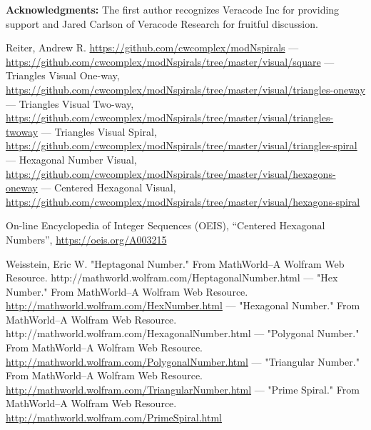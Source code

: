 \documentclass[11pt,reqno]{amsart}
\theoremstyle{mydef}
\begin{document}
\vspace{12pt}\noindent\textbf{Acknowledgments:}\quad
The first author recognizes Veracode Inc for providing support and Jared Carlson of Veracode Research for 
fruitful discussion.

\begin{thebibliography}{1}
 Reiter, Andrew R. \url{https://github.com/cwcomplex/modNspirals}
 ---  \url{https://github.com/cwcomplex/modNspirals/tree/master/visual/square}
 --- Triangles Visual One-way, \url{https://github.com/cwcomplex/modNspirals/tree/master/visual/triangles-oneway}
 --- Triangles Visual Two-way, \url{https://github.com/cwcomplex/modNspirals/tree/master/visual/triangles-twoway}
 --- Triangles Visual Spiral, \url{https://github.com/cwcomplex/modNspirals/tree/master/visual/triangles-spiral}
 --- Hexagonal Number Visual, \url{https://github.com/cwcomplex/modNspirals/tree/master/visual/hexagons-oneway}
 --- Centered Hexagonal Visual, \url{https://github.com/cwcomplex/modNspirals/tree/master/visual/hexagons-spiral}

 On-line Encyclopedia of Integer Sequences (OEIS), ``Centered Hexagonal Numbers'',
 \url{https://oeis.org/A003215}



 Weisstein, Eric W. "Heptagonal Number." From MathWorld--A Wolfram Web Resource. http://mathworld.wolfram.com/HeptagonalNumber.html
 --- "Hex Number." From MathWorld--A Wolfram Web Resource. \url{http://mathworld.wolfram.com/HexNumber.html}
 --- "Hexagonal Number." From MathWorld--A Wolfram Web Resource. http://mathworld.wolfram.com/HexagonalNumber.html
 --- "Polygonal Number." From MathWorld--A Wolfram Web Resource. \url{http://mathworld.wolfram.com/PolygonalNumber.html}  
 --- "Triangular Number." From MathWorld--A Wolfram Web Resource. \url{http://mathworld.wolfram.com/TriangularNumber.html}
 --- "Prime Spiral." From MathWorld--A Wolfram Web Resource. \url{http://mathworld.wolfram.com/PrimeSpiral.html}

\end{thebibliography}
\end{document}
